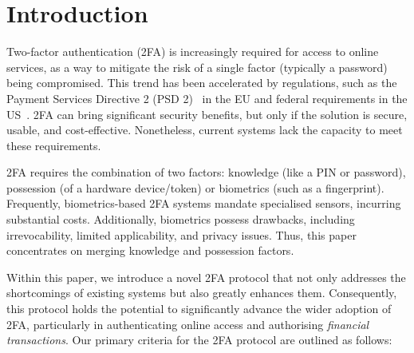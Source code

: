 


\section{Introduction}

Two-factor authentication (2FA) is increasingly required for access to online services, as a way to mitigate the risk of a single factor (typically a password) being compromised.
This trend has been accelerated by regulations, such as the Payment Services Directive 2 (PSD 2)~\cite{psd2} in the EU and federal requirements in the US~\cite{Zero-Trust-Cybersecurity}.
2FA can bring significant security benefits, but only if the solution is secure, usable, and cost-effective. Nonetheless, current systems lack the capacity to meet these requirements.


2FA requires the combination of two factors: knowledge (like a PIN or password), possession (of a hardware device/token) or biometrics (such as a fingerprint). Frequently, biometrics-based 2FA systems mandate specialised sensors, incurring substantial costs. 
Additionally, biometrics possess drawbacks, including irrevocability, limited applicability, and privacy issues.  Thus, this paper concentrates on merging knowledge and possession factors.




Within this paper, we introduce a novel 2FA protocol that not only addresses the shortcomings of existing systems but also greatly enhances them.  Consequently, this protocol holds the potential to significantly advance the wider adoption of 2FA, particularly in authenticating online access and authorising \emph{financial transactions}. 
%
Our primary criteria for the 2FA protocol are outlined as follows:


